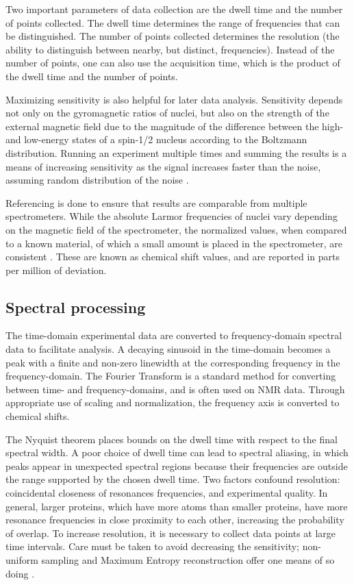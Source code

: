 Two important parameters of data collection are the dwell time and the number
of points collected.  The dwell time determines the range of frequencies that
can be distinguished.  The number of points collected determines the resolution
(the ability to distinguish between nearby, but distinct, frequencies).  Instead
of the number of points, one can also use the acquisition time, which is the
product of the dwell time and the number of points.

Maximizing sensitivity is also helpful for later data analysis.
Sensitivity depends not only on the gyromagnetic ratios of nuclei, but also
on the strength of the external magnetic field due to the magnitude of the
difference between the high- and low-energy states of a spin-1/2 nucleus
according to the Boltzmann distribution.
Running an experiment multiple times and summing the results is a 
means of increasing sensitivity as the signal increases faster
than the noise, assuming random distribution of the noise
\cite{ardenkjaer2003increase}.

Referencing is done to ensure that results are comparable from multiple
spectrometers.  While the absolute Larmor frequencies of nuclei vary depending
on the magnetic field of the spectrometer, the normalized values, when compared
to a known material, of which a small amount is placed in the spectrometer,
are consistent \cite{wishart19951h}.  These are known as chemical shift values,
and are reported in parts per million of deviation.

\subsection*{Spectral processing}

The time-domain experimental data are converted to frequency-domain spectral
data to facilitate analysis.  A decaying sinusoid in the time-domain becomes
a peak with a finite and non-zero linewidth at the corresponding frequency
in the frequency-domain.  The Fourier Transform \cite{cooley1965algorithm}
is a standard method for 
converting between time- and frequency-domains, and is often used on NMR data.
Through appropriate use of scaling and normalization, the frequency axis is
converted to chemical shifts.

The Nyquist theorem \cite{nyquist1928certain, shannon1949communication}
places bounds on the dwell time with respect to the 
final spectral width.  A poor choice of dwell time can lead to spectral 
aliasing, in which peaks appear in unexpected spectral regions because their
frequencies are outside the range supported by the chosen dwell time.
Two factors confound resolution:  coincidental
closeness of resonances frequencies, and experimental quality.  In general, 
larger proteins, which have more atoms than smaller proteins, have more resonance
frequencies in close proximity to each other, increasing the probability of 
overlap.  To increase resolution, it is necessary to collect data points at 
large time intervals.  Care must be taken to avoid decreasing the sensitivity;
non-uniform sampling and Maximum Entropy reconstruction offer one means of so
doing \cite{rovnyak2004accelerated, hoch1985maximum}.

